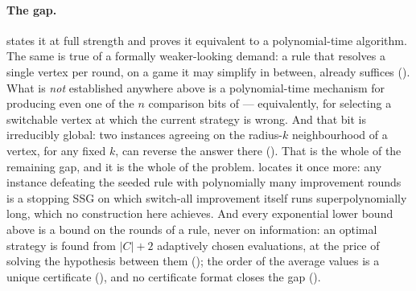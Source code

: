 \documentclass[11pt]{article}
\theoremstyle{plain}
\theoremstyle{definition}
\begin{document}
\paragraph{The gap.}  states it at full strength and
 proves it equivalent to a polynomial-time
algorithm. The same is true of a formally weaker-looking demand: a rule
that resolves a single vertex per round, on a game it may simplify in
between, already suffices (). What is
\emph{not} established anywhere above is a polynomial-time mechanism for
producing even one of the $n$ comparison bits of
 --- equivalently, for selecting a
switchable vertex at which the current strategy is wrong. And that bit is
irreducibly global: two instances agreeing on the radius-$k$
neighbourhood of a vertex, for any fixed $k$, can reverse the answer
there (). That is the whole of the remaining gap, and
it is the whole of the problem.  locates it once
more: any instance defeating the seeded rule with polynomially many
improvement rounds is a stopping SSG on which switch-all improvement
itself runs superpolynomially long, which no construction here achieves.
And every exponential lower bound above is a bound on the rounds of a
rule, never on information: an optimal strategy is found from $|C|+2$
adaptively chosen evaluations, at the price of solving the hypothesis
between them (); the order of the average values
is a unique certificate (), and no certificate
format closes the gap ().
\end{document}
